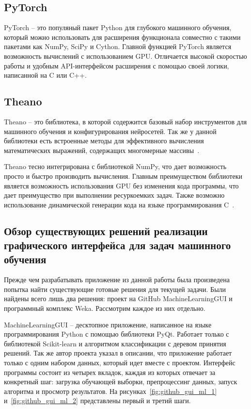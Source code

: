 \subsection{PyTorch}

PyTorch -- это популяный пакет Python для глубокого машинного обучения, который можно использовать для расширения функционала совместно с такими пакетами как NumPy, SciPy и Cython. Главной функцией PyTorch является возможность вычислений с использованием GPU. Отличается высокой скоростью работы и удобным API-интерфейсом расширения с помощью своей логики, написанной на C или C++.

\subsection{Theano}
Theano -- это библиотека, в которой содержится базовый набор инструментов для машинного обучения и конфигурирования нейросетей. Так же у данной библиотеки есть встроенные методы для эффективного вычисления математических выражений, содержащих многомерные массивы~\cite{rashka}.


Theano тесно интегрирована с библиотекой NumPy, что дает возможность просто и быстро производить вычисления. Главным преимуществом библиотеки является возможность использования GPU без изменения кода программы, что дает преимущество при выполнении ресуркоемких задач. Также возможно использование динамической генерации кода на языке программирования C~\cite{douson}.


\subsection{Обзор существующих решений реализации графического интерфейса для задач машинного обучения}

Прежде чем разрабатывать приложение из данной работы была произведена попытка найти существующие готовые решения для текущей задачи. Были найдены всего лишь два решения: проект на GitHub MachineLearningGUI и программный комплекс Weka. Рассмотрим каждое из них отдельно.


MachineLearningGUI -- десктопное приложение, написанное на языке программирования Python с помощью библиотеки PyQt. Работает только с библиотекой Scikit-learn и алгоритмом классификации с деревом принятия решений. Так же автор проекта указал в описании, что приложение работает только с одним набором данных, который идет вместе с проектом. Интерфейс программы состоит из четырех вкладок, каждая из которых отвечает за конкретный шаг: загрузка обучающей выборки, препроцессинг данных, запуск алгоритма и просмотр результатов. На рисунках~\ref{fig:github_gui_ml_1} и~\ref{fig:github_gui_ml_2} представлены первый и третий шаги.

